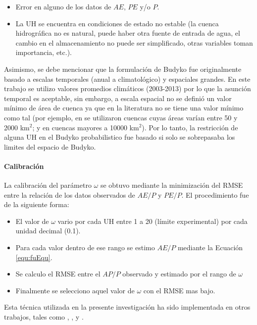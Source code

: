 \documentclass[12pt]{article}
\begin{document}
\begin{itemize}
    \item Error en alguno de los datos de $AE$, $PE$ y/o $P$.
    \item La UH se encuentra en condiciones de estado no estable (la cuenca hidrográfica no es natural, puede haber otra fuente de entrada de agua, el cambio en el almacenamiento no puede ser simplificado, otras variables toman importancia, etc.).
\end{itemize}

Asimismo, se debe mencionar que la formulación de Budyko fue originalmente basado a escalas temporales (anual a climatológico) y espaciales grandes. En este trabajo se utilizo valores promedios climáticos (2003-2013) por lo que la asunción temporal es aceptable, sin embargo, a escala espacial no se definió un valor mínimo de área de cuenca ya que en la literatura no se tiene una valor mínimo como tal (por ejemplo, en \citet{Zhang2004} se utilizaron cuencas cuyas áreas varían entre 50 y 2000 km$^{2}$; y en \citet{budyko1958heat} cuencas mayores a 10000 km$^{2}$). Por lo tanto, la restricción de alguna UH en el Budyko probabilistico fue basado si solo se sobrepasaba los limites del espacio de Budyko.

\paragraph{Calibración}\mbox{}

La calibración del parámetro $\omega$ se obtuvo mediante la minimización del RMSE entre la relación de los datos observados de $AE/P$ y $PE/P$. El procedimiento fue de la siguiente forma:

\begin{itemize}
  \item El valor de $\omega$ vario por cada UH entre 1 a 20 (límite experimental) por cada unidad decimal (0.1).
  \item Para cada valor dentro de ese rango se estimo $AE/P$ mediante la Ecuación \ref{equ:fuEqu}.
  \item Se calculo el RMSE entre el $AP/P$ observado y estimado por el rango de $\omega$
  \item Finalmente se selecciono aquel valor de $\omega$ con el RMSE mas bajo.
\end{itemize}

Esta técnica utilizada en la presente investigación ha sido implementada en otros trabajos, tales como \citet{Zhang2004}, \citet{xiong2012appraisal}, y \citet{Singh2015}.
\end{document}
